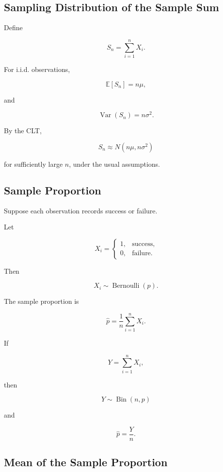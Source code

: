 \subsection{Sampling Distribution of the Sample Sum}
\label{subsec:sampling-distribution-sample-sum}

Define

\[
\boxed{
S_n
=
\sum_{i=1}^{n}X_i.
}
\]

For i.i.d. observations,

\[
\boxed{
\mathbb{E}[S_n]
=
n\mu,
}
\]

and

\[
\boxed{
\operatorname{Var}(S_n)
=
n\sigma^2.
}
\]

By the CLT,

\[
\boxed{
S_n
\approx
N(n\mu,n\sigma^2)
}
\]

for sufficiently large \(n\), under the usual assumptions.

\subsection{Sample Proportion}
\label{subsec:sample-proportion-sampling-distribution}

Suppose each observation records success or failure.

Let

\[
X_i
=
\begin{cases}
1,&\text{success},\\
0,&\text{failure}.
\end{cases}
\]

Then

\[
X_i\sim\operatorname{Bernoulli}(p).
\]

The sample proportion is

\[
\boxed{
\widehat{p}
=
\frac1n
\sum_{i=1}^{n}X_i.
}
\]

If

\[
Y
=
\sum_{i=1}^{n}X_i,
\]

then

\[
Y\sim\operatorname{Bin}(n,p)
\]

and

\[
\boxed{
\widehat{p}
=
\frac Yn.
}
\]

\subsection{Mean of the Sample Proportion}
\label{subsec:mean-sample-proportion}

